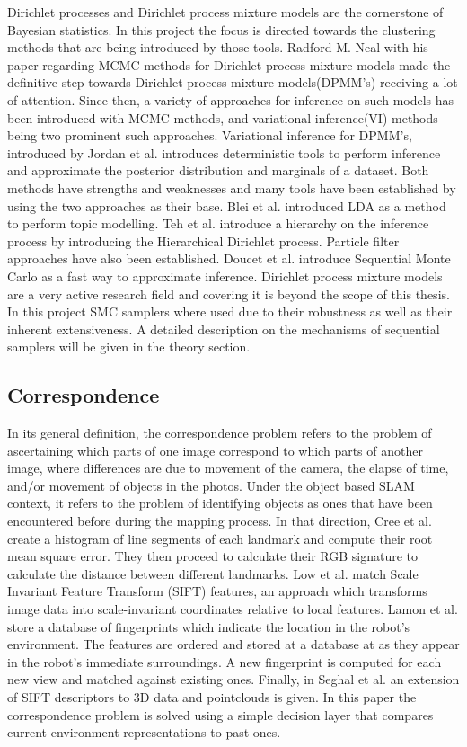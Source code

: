 \documentclass[twoside,hidelinks]{article}
\begin{document}
Dirichlet processes and Dirichlet process mixture models are the cornerstone of Bayesian statistics. In this project the focus is directed towards the clustering methods that are being introduced by those tools. Radford M. Neal\cite{bayes:neal} with his paper regarding MCMC methods for Dirichlet process mixture models made the definitive step towards Dirichlet process mixture models(DPMM's) receiving a lot of attention. Since then, a variety of approaches for inference on such models has been introduced with MCMC methods, and variational inference(VI) methods being two prominent such approaches. Variational inference for DPMM's, introduced by Jordan et al.\cite{bayes:jordan} introduces deterministic tools to perform inference and approximate the posterior distribution and marginals of a dataset. Both methods have strengths and weaknesses and many tools have been established by using the two approaches as their base. Blei et al.\cite{LDA} introduced LDA as a method to perform topic modelling. Teh et al.\cite{bayes:hier} introduce a hierarchy on the inference process by introducing the Hierarchical Dirichlet process. Particle filter approaches have also been established. Doucet et al.\cite{bayes:smc} introduce Sequential Monte Carlo as a fast way to approximate inference. Dirichlet process mixture models are a very active research field and covering it is beyond the scope of this thesis. In this project SMC samplers where used due to their robustness as well as their inherent extensiveness. A detailed description on the mechanisms of sequential samplers will be given in the theory section.

\subsection{Correspondence}

In its general definition, the correspondence problem refers to the problem of ascertaining which parts of one image correspond to which parts of another image, where differences are due to movement of the camera, the elapse of time, and/or movement of objects in the photos. Under the object based SLAM context, it refers to the problem of identifying objects as ones that have been encountered before during the mapping process. In that direction, Cree et al.\cite{corresp:first} create a histogram of line segments of each landmark and compute their root mean square error. They then proceed to calculate their RGB signature to calculate the distance between different landmarks. Low et al.\cite{corres:sec} match Scale Invariant Feature Transform (SIFT) features, an approach which transforms image data into scale-invariant coordinates relative to local features. Lamon et al.\cite{corres:three} store a database of fingerprints which indicate the location in the robot's environment. The features are ordered and stored at a database at as they appear in the robot's immediate surroundings. A new fingerprint is computed for each new view and matched against existing ones. Finally, in Seghal et al.\cite{corres:four} an extension of SIFT descriptors to 3D data and pointclouds is given. In this paper the correspondence problem is solved using a simple decision layer that compares current environment representations to past ones.
\end{document}
